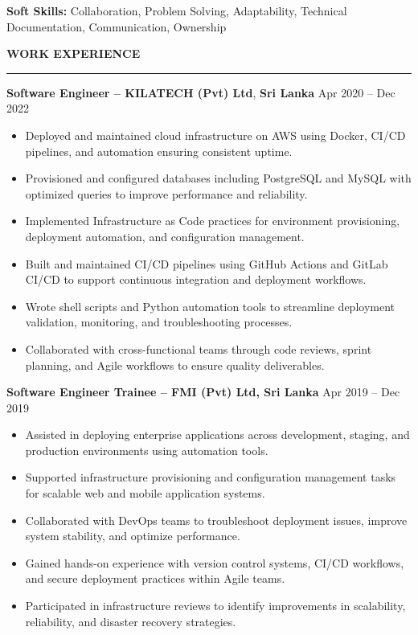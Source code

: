 \documentclass[10pt,letterpaper]{article}
\begin{document}
\textbf{Soft Skills:} Collaboration, Problem Solving, Adaptability, Technical Documentation, Communication, Ownership

\vspace{8pt}

\textbf{WORK EXPERIENCE}\\[-8pt]
\noindent\rule{\textwidth}{1pt}

\vspace{-2pt}

\textbf{Software Engineer -- KILATECH (Pvt) Ltd}, \textbf{Sri Lanka} \hfill Apr 2020 -- Dec 2022

\vspace{-1pt}

\begin{itemize}
\item Deployed and maintained cloud infrastructure on AWS using Docker, CI/CD pipelines, and automation ensuring consistent uptime.
\item Provisioned and configured databases including PostgreSQL and MySQL with optimized queries to improve performance and reliability.
\item Implemented Infrastructure as Code practices for environment provisioning, deployment automation, and configuration management.
\item Built and maintained CI/CD pipelines using GitHub Actions and GitLab CI/CD to support continuous integration and deployment workflows.
\item Wrote shell scripts and Python automation tools to streamline deployment validation, monitoring, and troubleshooting processes.
\item Collaborated with cross-functional teams through code reviews, sprint planning, and Agile workflows to ensure quality deliverables.
\end{itemize}

\textbf{Software Engineer Trainee -- FMI (Pvt) Ltd, Sri Lanka} \hfill Apr 2019 -- Dec 2019

\vspace{-1pt}

\begin{itemize}
\item Assisted in deploying enterprise applications across development, staging, and production environments using automation tools.
\item Supported infrastructure provisioning and configuration management tasks for scalable web and mobile application systems.
\item Collaborated with DevOps teams to troubleshoot deployment issues, improve system stability, and optimize performance.
\item Gained hands-on experience with version control systems, CI/CD workflows, and secure deployment practices within Agile teams.
\item Participated in infrastructure reviews to identify improvements in scalability, reliability, and disaster recovery strategies.
\end{itemize}
\end{document}

